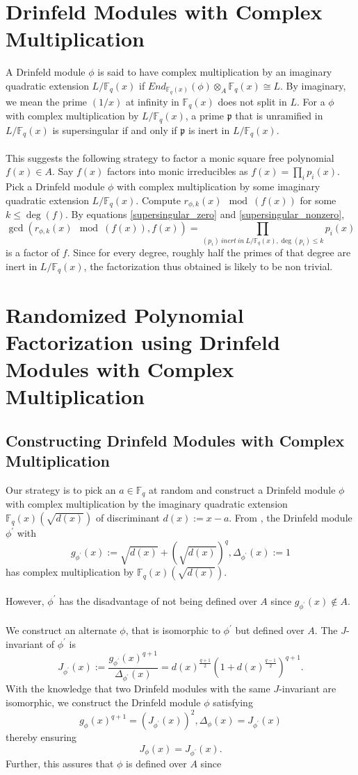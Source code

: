\documentclass{article}
\theoremstyle{plain}
\theoremstyle{definition}
\def\F{\ensuremath{\mathbb{F}}}
\newcommand{\D}{\Delta}
\newcommand{\p}{\mathfrak p}
\begin{document}
\section{Drinfeld Modules with Complex Multiplication}\label{randomized_section}
A Drinfeld module $\phi$ is said to have complex multiplication by an imaginary quadratic extension $L/\F_q(x)$ if $End_{\F_q(x)}(\phi)\otimes_A \F_q(x) \cong L$. By imaginary, we mean the prime $(1/x)$ at infinity in $\F_q(x)$ does not split in $L$. For a $\phi$ with complex multiplication by $L/\F_q(x)$, a prime $\p$ that is unramified in $L/\F_q(x)$  is supersingular if and only if $\p$ is inert in $L/\F_q(x)$.\\ \\
This suggests the following  strategy to factor a monic square free polynomial $f(x) \in A$. Say $f(x)$ factors into monic irreducibles as $f(x) = \prod_i p_i(x)$. Pick a Drinfeld module $\phi$ with complex multiplication by some imaginary quadratic extension $L/\F_q(x)$. Compute $r_{\phi,k}(x) \mod (f(x))$ for some $k \leq \deg(f)$. By equations \ref{supersingular_zero} and \ref{supersingular_nonzero}, $$\gcd(r_{\phi,k}(x) \mod (f(x)), f(x)) = \prod_{(p_i)\ inert\ in\ L/\F_q(x), \deg(p_i)\leq k}p_i(x)$$ is a factor of $f$. Since for every degree, roughly half the primes of that degree are inert in $L/\F_q(x)$, the factorization  thus obtained is likely to be non trivial. 
\section{Randomized Polynomial Factorization using Drinfeld Modules with Complex Multiplication}
\subsection{Constructing Drinfeld Modules with Complex Multiplication}\label{drinfeld_construction_subsection}
Our strategy is to pick an $a \in \F_q$ at random and construct a Drinfeld module $\phi$ with complex multiplication by the imaginary quadratic extension $\F_q(x)(\sqrt{d(x)})$ of discriminant $d(x):=x-a$. From \cite{dor}, the Drinfeld module $\phi^\prime$ with $$g_{\phi^\prime}(x):=\sqrt{d(x)}+\left(\sqrt{d(x)}\right)^q, \D_{\phi^\prime}(x) := 1$$ has complex multiplication by $\F_q(x)(\sqrt{d(x)})$.\\ \\
However, $\phi^\prime$ has the disadvantage of not being defined over $A$ since $g_{\phi^\prime}(x) \notin A$.\\ \\
We construct an alternate $\phi$, that is isomorphic to $\phi^\prime$ but defined over $A$. The $J$-invariant \cite{gek} of $\phi^\prime$ is $$J_{\phi^\prime}(x) := \frac{g_{\phi^\prime}(x)^{q+1}}{\D_{\phi^\prime}(x)} = d(x)^{\frac{q+1}{2}}\left(1+d(x)^{\frac{q-1}{2}}\right)^{q+1}.$$
With the knowledge that two Drinfeld modules with the same $J$-invariant are isomorphic, we construct the Drinfeld module $\phi$ satisfying $$g_\phi(x)^{q+1} = (J_{\phi^\prime}(x))^2, \D_{\phi}(x)= J_{\phi^\prime}(x)$$ thereby ensuring $$J_{\phi}(x)=J_{\phi^\prime}(x).$$ Further, this assures that $\phi$ is defined over $A$ since
\end{document}

